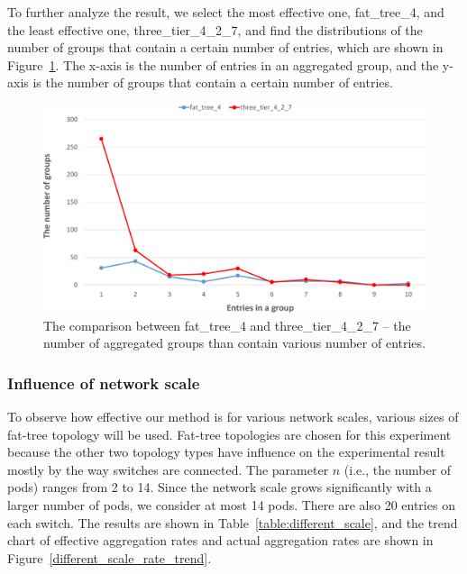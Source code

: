 \documentclass[conference]{IEEEtran}
\begin{document}
To further analyze the result, we select the most effective one, fat\_tree\_4, and the least effective one, three\_tier\_4\_2\_7, and find the distributions of the number of groups that contain a certain number of entries, which are shown in Figure~\ref{different_topo_distribute}. The x-axis is the number of entries in an aggregated group, and the y-axis is the number of groups that contain a certain number of entries.

\begin{figure}[ht]
\centering 
\includegraphics[width=1\linewidth]{figures/exp_topotype_distribute.pdf}
\caption{The comparison between fat\_tree\_4 and three\_tier\_4\_2\_7 -- the number of aggregated groups than contain various number of entries.}
\label{different_topo_distribute}
\end{figure}

\subsubsection{Influence of network scale}
To observe how effective our method is for various network scales, various sizes of fat-tree topology will be used. Fat-tree topologies are chosen for this experiment because the other two topology types have influence on the experimental result mostly by the way switches are connected. The parameter $n$ (i.e., the number of pods) ranges from 2 to 14. Since the network scale grows significantly with a larger number of pods, we consider at most 14 pods. There are also 20 entries on each switch. The results are shown in Table~\ref{table:different_scale}, and the trend chart of effective aggregation rates and actual aggregation rates are shown in Figure~\ref{different_scale_rate_trend}.
\end{document}
